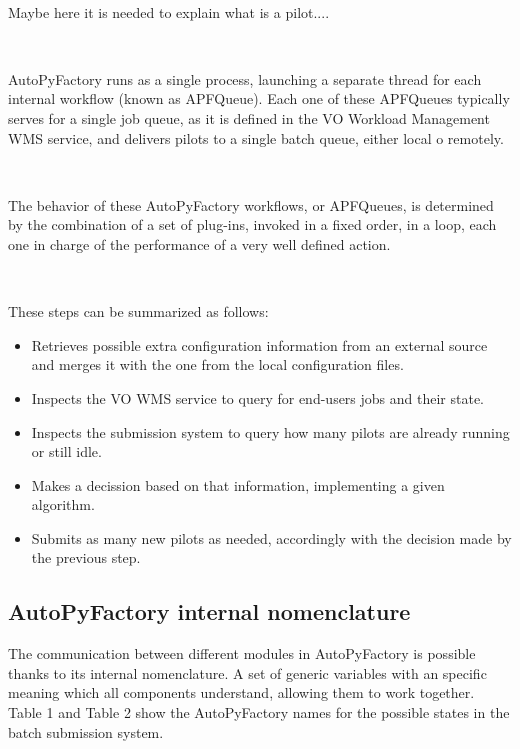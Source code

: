 \documentclass[a4paper]{jpconf}
\begin{document}
~

Maybe here it is needed to explain what is a pilot....

~

AutoPyFactory runs as a single process,
launching a separate thread for each internal workflow (known as APFQueue).
Each one of these APFQueues typically serves for a single job queue, 
as it is defined in the VO Workload Management WMS service, 
and delivers pilots to a single batch queue,
either local o remotely. 

~

The behavior of these AutoPyFactory workflows, or APFQueues,
is determined by the combination of a set of plug-ins, 
invoked in a fixed order, 
in a loop,   
each one in charge of the performance of a very well defined action.

~

These steps can be summarized as follows:
\begin{itemize}
    \item Retrieves possible extra configuration information from an external source 
          and merges it with the one from the local configuration files.
    \item Inspects the VO WMS service to query for end-users jobs and their state.
    \item Inspects the submission system to query how many pilots are already running or still idle.
    \item Makes a decission based on that information, implementing a given algorithm. 
    \item Submits as many new pilots as needed, accordingly with the decision made by the previous step.
\end{itemize}

\subsection{AutoPyFactory internal nomenclature}

The communication between different modules in AutoPyFactory 
is possible thanks to its internal nomenclature.
A set of generic variables with an specific meaning which all components 
understand, allowing them to work together. 
Table 1 and Table 2 show the AutoPyFactory names for the
possible states in the batch submission system. 
\end{document}

